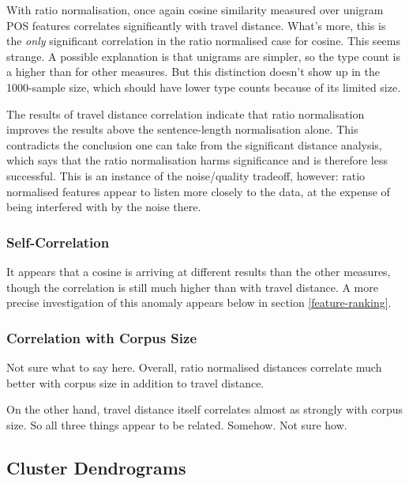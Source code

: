 With ratio normalisation, once again cosine similarity measured over
unigram POS features correlates significantly with travel
distance. What's more, this is the {\it only} significant correlation
in the ratio normalised case for cosine. This seems strange. A
possible explanation is that unigrams are simpler, so the type count
is a higher than for other measures. But this distinction doesn't show up in
the 1000-sample size, which should have lower type counts because of
its limited size.

The results of travel distance correlation indicate that ratio
normalisation improves the results above the sentence-length
normalisation alone. This contradicts the conclusion one can take from
the significant distance analysis, which says that the ratio
normalisation harms significance and is therefore less
successful. This is an instance of the noise/quality tradeoff,
however: ratio normalised features appear to listen more closely to
the data, at the expense of being interfered with by the noise there.

\subsubsection{Self-Correlation}

It appears that a cosine is arriving at different results than the
other measures, though the correlation is still much higher than with
travel distance. A more precise investigation of this anomaly appears
below in section \ref{feature-ranking}.

\subsubsection{Correlation with Corpus Size}

Not sure what to say here. Overall, ratio normalised distances correlate much
better with corpus size in addition to travel distance.

On the other hand, travel distance itself correlates almost as
strongly with corpus size. So all three things appear to be
related. Somehow. Not sure how.

\subsection{Cluster Dendrograms}

